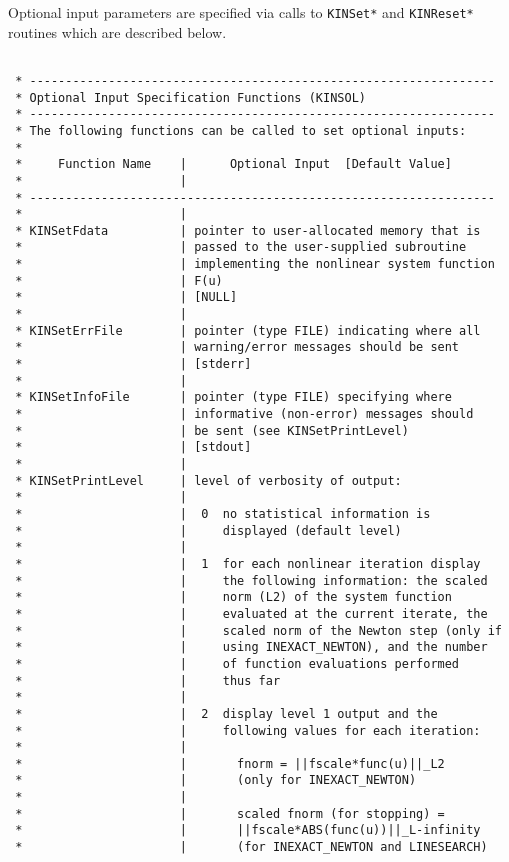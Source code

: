 \documentclass[11pt]{article}
\begin{document}
Optional input parameters are specified via calls to {\tt KINSet*} and {\tt KINReset*} routines
which are described below.
\small
\begin{verbatim}

 * -----------------------------------------------------------------
 * Optional Input Specification Functions (KINSOL)
 * -----------------------------------------------------------------
 * The following functions can be called to set optional inputs:
 *
 *     Function Name    |      Optional Input  [Default Value]
 *                      |
 * -----------------------------------------------------------------
 *                      |
 * KINSetFdata          | pointer to user-allocated memory that is
 *                      | passed to the user-supplied subroutine
 *                      | implementing the nonlinear system function
 *                      | F(u)
 *                      | [NULL]
 *                      |
 * KINSetErrFile        | pointer (type FILE) indicating where all
 *                      | warning/error messages should be sent
 *                      | [stderr]
 *                      |
 * KINSetInfoFile       | pointer (type FILE) specifying where
 *                      | informative (non-error) messages should
 *                      | be sent (see KINSetPrintLevel)
 *                      | [stdout]
 *                      |
 * KINSetPrintLevel     | level of verbosity of output:
 *                      |
 *                      |  0  no statistical information is
 *                      |     displayed (default level)
 *                      |
 *                      |  1  for each nonlinear iteration display
 *                      |     the following information: the scaled
 *                      |     norm (L2) of the system function
 *                      |     evaluated at the current iterate, the
 *                      |     scaled norm of the Newton step (only if
 *                      |     using INEXACT_NEWTON), and the number
 *                      |     of function evaluations performed
 *                      |     thus far
 *                      |
 *                      |  2  display level 1 output and the
 *                      |     following values for each iteration:
 *                      |
 *                      |       fnorm = ||fscale*func(u)||_L2
 *                      |       (only for INEXACT_NEWTON)
 *                      |
 *                      |       scaled fnorm (for stopping) =
 *                      |       ||fscale*ABS(func(u))||_L-infinity
 *                      |       (for INEXACT_NEWTON and LINESEARCH)

\end{verbatim}
\end{document}
